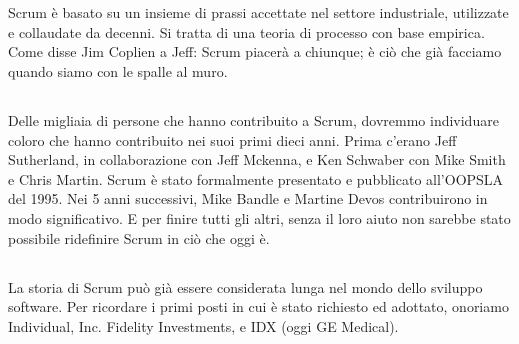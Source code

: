 \section*{\color{Blue}{RINGRAZIAMENTI}}
\label{sec:acknowledgements}

\subsection*{\color{Blue}{GENERALI}}
\label{sec:general}
Scrum \`e basato su un insieme di prassi accettate nel settore industriale, utilizzate e collaudate da decenni. Si tratta di una teoria di processo con base empirica. Come disse Jim Coplien a Jeff: \flqq Scrum piacer\`a a chiunque; \`e ci\`o che gi\`a facciamo quando siamo con le spalle al muro.\frqq

\subsection*{\color{Blue}{PERSONE}}
\label{sec:people}
Delle migliaia di persone che hanno contribuito a Scrum, dovremmo individuare coloro che hanno contribuito nei suoi primi dieci anni. Prima c'erano Jeff Sutherland, in collaborazione con Jeff Mckenna, e Ken Schwaber con Mike Smith e Chris Martin. Scrum \`e stato formalmente presentato e pubblicato all'OOPSLA del 1995. Nei 5 anni successivi, Mike Bandle e Martine Devos contribuirono in modo significativo. E per finire tutti gli altri, senza il loro aiuto non sarebbe stato possibile ridefinire Scrum in ci\`o che oggi \`e.

\subsection*{\color{Blue}{STORIA}}
\label{sec:history}
La storia di Scrum pu\`o gi\`a essere considerata lunga nel mondo dello sviluppo software.
Per ricordare i primi posti in cui \`e stato richiesto ed adottato, onoriamo Individual, Inc. Fidelity Investments, e IDX (oggi GE Medical).

